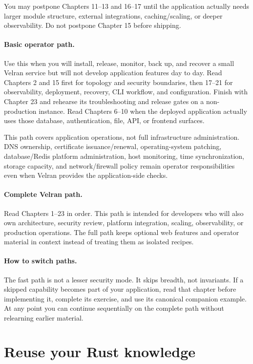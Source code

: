 You may postpone Chapters 11--13 and 16--17 until the application actually needs larger module structure, external integrations, caching/scaling, or deeper observability. Do not postpone Chapter 15 before shipping.

\paragraph{Basic operator path.}
Use this when you will install, release, monitor, back up, and recover a small Velran service but will not develop application features day to day. Read Chapters 2 and 15 first for topology and security boundaries, then 17--21 for observability, deployment, recovery, CLI workflow, and configuration. Finish with Chapter 23 and rehearse its troubleshooting and release gates on a non-production instance. Read Chapters 6--10 when the deployed application actually uses those database, authentication, file, API, or frontend surfaces.

This path covers application operations, not full infrastructure administration. DNS ownership, certificate issuance/renewal, operating-system patching, database/Redis platform administration, host monitoring, time synchronization, storage capacity, and network/firewall policy remain operator responsibilities even when Velran provides the application-side checks.

\paragraph{Complete Velran path.}
Read Chapters 1--23 in order. This path is intended for developers who will also own architecture, security review, platform integration, scaling, observability, or production operations. The full path keeps optional web features and operator material in context instead of treating them as isolated recipes.

\paragraph{How to switch paths.}
The fast path is not a lesser security mode. It skips breadth, not invariants. If a skipped capability becomes part of your application, read that chapter before implementing it, complete its exercise, and use its canonical companion example. At any point you can continue sequentially on the complete path without relearning earlier material.

\section*{Reuse your Rust knowledge}

